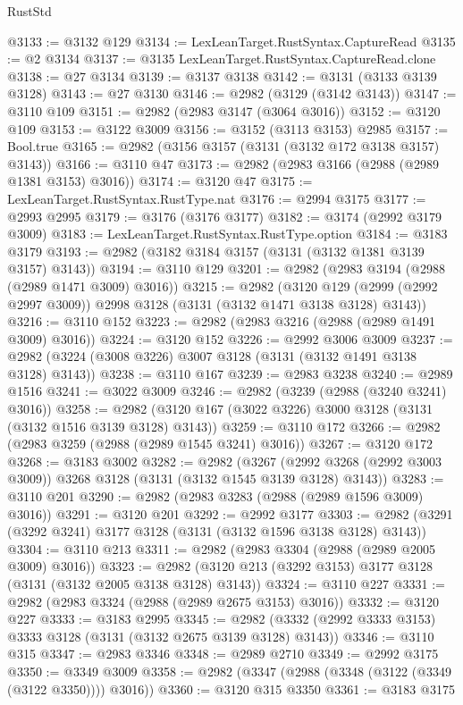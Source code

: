 \begin{lexlean}{RustStd}
\begin{coremodule}
@3133 := @3132 @129
@3134 := LexLeanTarget.RustSyntax.CaptureRead
@3135 := @2 @3134
@3137 := @3135 LexLeanTarget.RustSyntax.CaptureRead.clone
@3138 := @27 @3134
@3139 := @3137 @3138
@3142 := @3131 (@3133 @3139 @3128)
@3143 := @27 @3130
@3146 := @2982 (@3129 (@3142 @3143))
@3147 := @3110 @109
@3151 := @2982 (@2983 @3147 (@3064 @3016))
@3152 := @3120 @109
@3153 := @3122 @3009
@3156 := @3152 (@3113 @3153) @2985
@3157 := Bool.true
@3165 := @2982 (@3156 @3157 (@3131 (@3132 @172 @3138 @3157) @3143))
@3166 := @3110 @47
@3173 := @2982 (@2983 @3166 (@2988 (@2989 @1381 @3153) @3016))
@3174 := @3120 @47
@3175 := LexLeanTarget.RustSyntax.RustType.nat
@3176 := @2994 @3175
@3177 := @2993 @2995
@3179 := @3176 (@3176 @3177)
@3182 := @3174 (@2992 @3179 @3009)
@3183 := LexLeanTarget.RustSyntax.RustType.option
@3184 := @3183 @3179
@3193 := @2982 (@3182 @3184 @3157 (@3131 (@3132 @1381 @3139 @3157) @3143))
@3194 := @3110 @129
@3201 := @2982 (@2983 @3194 (@2988 (@2989 @1471 @3009) @3016))
@3215 := @2982
    (@3120 @129 (@2999 (@2992 @2997 @3009)) @2998 @3128 (@3131 (@3132 @1471 @3138 @3128) @3143))
@3216 := @3110 @152
@3223 := @2982 (@2983 @3216 (@2988 (@2989 @1491 @3009) @3016))
@3224 := @3120 @152
@3226 := @2992 @3006 @3009
@3237 := @2982 (@3224 (@3008 @3226) @3007 @3128 (@3131 (@3132 @1491 @3138 @3128) @3143))
@3238 := @3110 @167
@3239 := @2983 @3238
@3240 := @2989 @1516
@3241 := @3022 @3009
@3246 := @2982 (@3239 (@2988 (@3240 @3241) @3016))
@3258 := @2982 (@3120 @167 (@3022 @3226) @3000 @3128 (@3131 (@3132 @1516 @3139 @3128) @3143))
@3259 := @3110 @172
@3266 := @2982 (@2983 @3259 (@2988 (@2989 @1545 @3241) @3016))
@3267 := @3120 @172
@3268 := @3183 @3002
@3282 := @2982
    (@3267 (@2992 @3268 (@2992 @3003 @3009)) @3268 @3128 (@3131 (@3132 @1545 @3139 @3128) @3143))
@3283 := @3110 @201
@3290 := @2982 (@2983 @3283 (@2988 (@2989 @1596 @3009) @3016))
@3291 := @3120 @201
@3292 := @2992 @3177
@3303 := @2982 (@3291 (@3292 @3241) @3177 @3128 (@3131 (@3132 @1596 @3138 @3128) @3143))
@3304 := @3110 @213
@3311 := @2982 (@2983 @3304 (@2988 (@2989 @2005 @3009) @3016))
@3323 := @2982 (@3120 @213 (@3292 @3153) @3177 @3128 (@3131 (@3132 @2005 @3138 @3128) @3143))
@3324 := @3110 @227
@3331 := @2982 (@2983 @3324 (@2988 (@2989 @2675 @3153) @3016))
@3332 := @3120 @227
@3333 := @3183 @2995
@3345 := @2982 (@3332 (@2992 @3333 @3153) @3333 @3128 (@3131 (@3132 @2675 @3139 @3128) @3143))
@3346 := @3110 @315
@3347 := @2983 @3346
@3348 := @2989 @2710
@3349 := @2992 @3175
@3350 := @3349 @3009
@3358 := @2982 (@3347 (@2988 (@3348 (@3122 (@3349 (@3122 @3350)))) @3016))
@3360 := @3120 @315 @3350
@3361 := @3183 @3175

\end{coremodule}
\end{lexlean}
